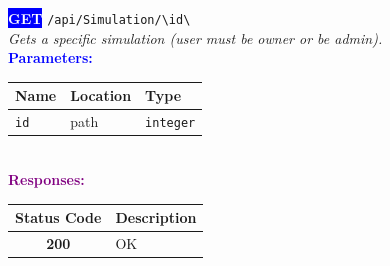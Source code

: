 \begin{tcolorbox}[
    colback=blue!5,
    colframe=blue,
    arc=2mm,
    boxrule=1pt,
    left=5pt,
    right=5pt,
    top=5pt,
    bottom=5pt
]
\noindent\colorbox{blue}{\textcolor{white}{\textbf{GET}}} 
\texttt{\large /api/Simulation/\textbackslash{}{id\textbackslash{}}}\\[0.3em]
\textit{Gets a specific simulation (user must be owner or be admin).}\\[0.3em]
\vspace{0.3em}
\textbf{\textcolor{blue}{Parameters:}}\\[0.2em]
\begin{tabular}{|l|l|l|}
\hline
\rowcolor{gray!20}
\textbf{Name} & \textbf{Location} & \textbf{Type} \\ \hline
\texttt{id} & path & \texttt{integer} \\ \hline
\end{tabular}\\[0.5em]
\vspace{0.3em}
\textbf{\textcolor{purple}{Responses:}}\\[0.2em]
\begin{tabular}{|c|p{10cm}|}
\hline
\rowcolor{gray!20}
\textbf{Status Code} & \textbf{Description} \\ \hline
\colorbox{green!20}{\textbf{200}} & OK \\ \hline
\end{tabular}
\end{tcolorbox}
\vspace{0.5em}

